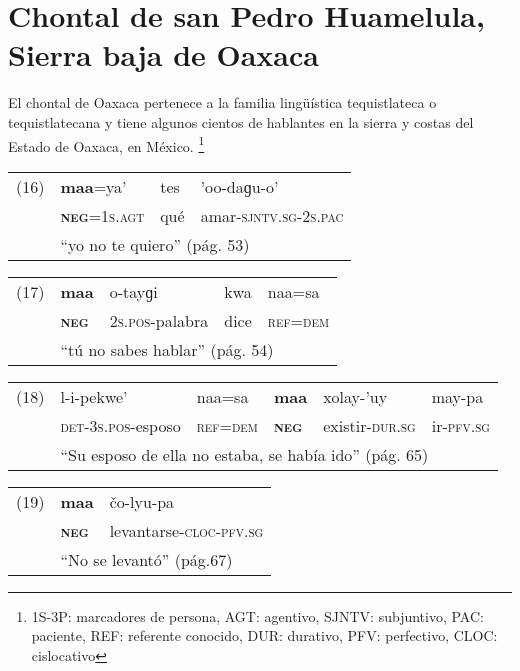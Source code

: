 \section*{Chontal de san Pedro Huamelula, Sierra baja de Oaxaca}

\noindent El chontal de Oaxaca pertenece a la familia lingüística tequistlateca o tequistlatecana y tiene algunos cientos de hablantes en la sierra y costas del Estado de Oaxaca, en México.
\footnote{1S-3P: marcadores de persona, AGT: agentivo, SJNTV: subjuntivo, PAC: paciente, REF: referente conocido, DUR: durativo, PFV: perfectivo, CLOC: cislocativo}
\vspace{0.5cm}

{\setmainfont{Charis SIL}

\begin{tabular}{llll}
(16) & \textbf{maa}=ya'& tes & 'oo-daɡu-o' \\
& \textsc{\textbf{neg}}=\textsc{1s.agt} & qué & amar-\textsc{sjntv.sg-2s.pac} \\
& \multicolumn{3}{l}{``yo no te quiero'' (pág. 53)}
\end{tabular} \vspace{0.5cm}

\begin{tabular}{lllll}
(17) & \textbf{maa} & o-tayɡi & kwa & naa=sa \\
& \textsc{\textbf{neg}} & \textsc{2s.pos}-palabra & dice & \textsc{ref=dem} \\
& \multicolumn{4}{l}{``tú no sabes hablar'' (pág. 54)}
\end{tabular} \vspace{0.5cm}

\begin{tabular}{llllll}
(18) & l-i-pekwe’ & naa=sa & \textbf{maa} & xolay-’uy & may-pa \\
& \textsc{det-3s.pos}-esposo & \textsc{ref=dem} & \textsc{\textbf{neg}} & existir-\textsc{dur.sg} & ir-\textsc{pfv.sg} \\
& \multicolumn{5}{l}{``Su esposo de ella no estaba, se había ido'' (pág. 65)}
\end{tabular} \vspace{0.5cm}

\begin{tabular}{lll}
(19) & \textbf{maa} & čo-lyu-pa \\
& \textsc{\textbf{neg}} & levantarse-\textsc{cloc-pfv.sg} \\
& \multicolumn{2}{l}{``No se levantó'' (pág.67)}
\end{tabular} \vspace{0.5cm}

}
